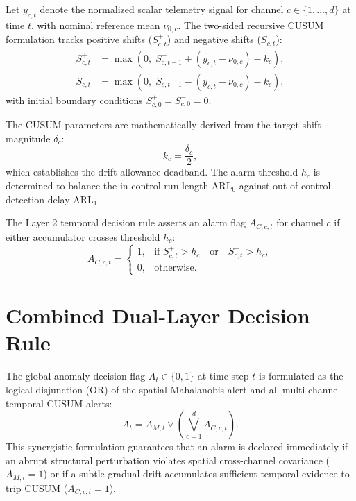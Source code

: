 \documentclass[12pt,a4paper]{report}
\begin{document}
Let $y_{c,t}$ denote the normalized scalar telemetry signal for channel $c \in \{1, \dots, d\}$
at time $t$, with nominal reference mean $\nu_{0,c}$. The two-sided recursive CUSUM
formulation tracks positive shifts ($S_{c,t}^+$) and negative shifts ($S_{c,t}^-$):
\begin{align}
S_{c,t}^+ &= \max\left(0, \; S_{c,t-1}^+ + (y_{c,t} - \nu_{0,c}) - k_c\right), \label{eq:ch3_cusum_pos} \\
S_{c,t}^- &= \max\left(0, \; S_{c,t-1}^- - (y_{c,t} - \nu_{0,c}) - k_c\right), \label{eq:ch3_cusum_neg}
\end{align}
with initial boundary conditions $S_{c,0}^+ = S_{c,0}^- = 0$.

The CUSUM parameters are mathematically derived from the target shift magnitude $\delta_c$:
\begin{equation}
k_c = \frac{\delta_c}{2},
\end{equation}
which establishes the drift allowance deadband. The alarm threshold $h_c$ is determined
to balance the in-control run length $\text{ARL}_0$ against out-of-control detection delay $\text{ARL}_1$.

The Layer 2 temporal decision rule asserts an alarm flag $A_{C,c,t}$ for channel $c$ if
either accumulator crosses threshold $h_c$:
\begin{equation}
A_{C,c,t} = \begin{cases}
1, & \text{if } S_{c,t}^+ > h_c \quad \text{or} \quad S_{c,t}^- > h_c, \\
0, & \text{otherwise}.
\end{cases}
\label{eq:ch3_layer2_decision}
\end{equation}

\section{Combined Dual-Layer Decision Rule}
The global anomaly decision flag $A_t \in \{0, 1\}$ at time step $t$ is formulated as the
logical disjunction (OR) of the spatial Mahalanobis alert and all multi-channel temporal
CUSUM alerts:
\begin{equation}
A_t = A_{M,t} \lor \left( \bigvee_{c=1}^d A_{C,c,t} \right).
\label{eq:ch3_global_decision}
\end{equation}
This synergistic formulation guarantees that an alarm is declared immediately if an abrupt
structural perturbation violates spatial cross-channel covariance ($A_{M,t} = 1$) or if a
subtle gradual drift accumulates sufficient temporal evidence to trip CUSUM ($A_{C,c,t} = 1$).
\end{document}
